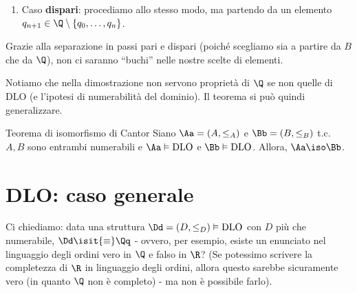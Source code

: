 \documentclass[a4paper,11pt]{report}
\begin{document}
\begin{proofframe}
\begin{itemize}
\begin{enumerate}
\begin{itemize}
                            {\color{gray}(Scelgo un elemento da \( \Q \) che sia anch'esso dopo tutti gli altri)}

                        \item {\color{gray}(Da qualche parte nel mezzo)}

                            Nessuno dei primi due casi. Allora esistono \(m_0, m_1 \le n\) tali che \(p_{m_0} < p_{n+1} < p_{m_1}\) e nessun altro elemento di \(\{p_0, p_1, \dots, p_n\}\) è nell'intervallo \([p_{m_0}, d_{m_1}]\). In questo caso scelgo un elemento \(d_{n+1}\) in \(\Q\) tale che \(d_{m_0} < d_{n+1} < d_{m_1}\). Questo elemento esiste perché \(\Q\) soddisfa l'assioma di \textit{densità}.
                            
                            {\color{gray}(Scelgo un elemento da \( \Q \) che sia anch'esso in mezzo agli altri)}

                    \end{itemize}

                \item Caso \textbf{dispari}: procediamo allo stesso modo, ma partendo da un elemento \(q_{n+1} \in \Q \setminus \{q_0, \dots, q_n\}\).

            \end{enumerate}

    \end{itemize}

    Grazie alla separazione in passi pari e dispari (poiché scegliamo sia a partire da \( B \) che da \( \Q\)), non ci saranno ``buchi'' nelle nostre scelte di elementi. 
\end{proofframe}

Notiamo che nella dimostrazione non servono proprietà di \( \Q \) se non quelle di DLO (e l'ipotesi di numerabilità del dominio). Il teorema si può quindi generalizzare.

\begin{thmframe}{Teorema di isomorfismo di Cantor}{}
        \label{thm:Cantor}
    Siano \( \Aa = (A, \leq_A) \) e \( \Bb = (B, \leq_B) \) t.c. \( A, B \) sono entrambi numerabili e \( \Aa \vDash \text{DLO} \) e \( \Bb \vDash \text{DLO} \). Allora, \( \Aa \iso \Bb \).
\end{thmframe}



\section{DLO: caso generale}
Ci chiediamo: data una struttura \( \Dd = (D, \leq_D) \vDash \text{DLO}\) con \( D \) più che numerabile, \( \Dd \isit{\equiv} \Qq \) - ovvero, per esempio, esiste un enunciato nel linguaggio degli ordini vero in \( \Q \) e falso in \( \R \)? (Se potessimo scrivere la completezza di \( \R \) in linguaggio degli ordini, allora questo sarebbe sicuramente vero (in quanto \(\Q\) non è completo) - ma non è possibile farlo).
\end{document}
